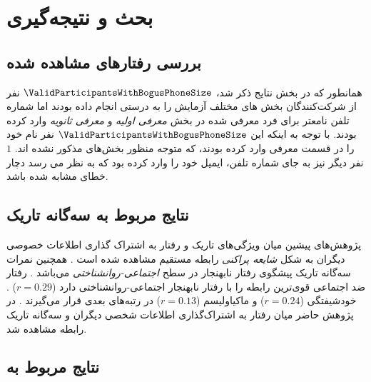 \chapter{بحث و نتیجه‌گیری}
\section{بررسی رفتارهای مشاهده شده }
همانطور که در بخش نتایج ذکر شد،
$\ValidParticipantsWithBogusPhoneSize$
نفر  از شرکت‌کنندگان
بخش های مختلف آزمایش را به درستی انجام داده بودند اما شماره تلفن نامعتر
برای فرد معرفی شده در بخش‌
\textit{معرفی اولیه}
و
\textit{معرفی ثانویه}
وارد کرده بودند. با توجه به اینکه این $\ValidParticipantsWithBogusPhoneSize$
نفر نام
خود را در قسمت معرفی وارد کرده بودند، که متوجه منظور بخش‌های مذکور نشده اند.
$1$
نفر دیگر نیز به جای شماره تلفن، ایمیل خود را وارد کرده بود که به نظر می رسد دچار خطای مشابه
شده باشد.
\section{نتایج مربوط به سه‌گانه تاریک}
پژوهش‌های پیشین میان ویژگی‌های تاریک و رفتار
به اشتراک گذاری اطلاعات خصوصی دیگران به شکل
\textit{
    شایعه پراکنی
}
رابطه مستقیم مشاهده شده است
\!\citep{hartungBetterItsReputation2019}
\!.
همچنین نمرات سه‌گانه تاریک پیشگوی رفتار نابهنجار در سطح
\textit{
    اجتماعی-روانشناختی
}
می‌باشد
\!\citep{murisMalevolentSideHuman2017}
\!.
رفتار ضد اجتماعی قوی‌ترین رابطه را با رفتار نابهنجار اجتماعی-روانشناختی دارد
($r = 0.29$)
\!. خودشیفتگی
($r = 0.24$)
و ماکیاولیسم
($r = 0.13$)
در رتبه‌های بعدی قرار می‌گیرند
\!.
در پژوهش حاضر میان رفتار به اشتراک‌گذاری اطلاعات شخصی دیگران و سه‌گانه تاریک رابطه مشاهده شد.

\section{
  نتایج مربوط به
 }
